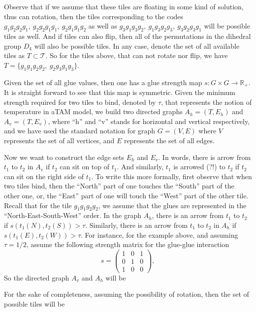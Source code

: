 \documentclass[11pt,a4paper]{article}
\theoremstyle{definition}
\theoremstyle{remark}
\theoremstyle{definition}
\begin{document}
	Observe that if we assume that these tiles are floating in some kind of solution, thus can rotation, then the tiles corresponding to the codes $ g_1g_2g_2g_1,\ g_2g_2g_1g_1,\ g_2g_1g_1g_2 $ as well as $ g_3g_1g_3g_2,\ g_1g_3g_2g_3,\ g_3g_2g_3g_1  $ will be possible tiles as well. And if tiles can also flip, then all of the permutations in the dihedral group $ D_4 $ will also be possible tiles. In any case, denote the set of all available tiles as $ T \subset\mathcal{T} $. So for the tiles above, that can not rotate nor flip, we have $ T=\{g_1g_1g_2g_2,\ g_2g_3g_1g_3\}. $
		
		
	Given the set of all glue values, then one has a glue strength map $ s: G\times G \to \mathbb{R}_{+} $. It is straight forward to see that this map is symmetric. Given the minimum strength required for two tiles to bind, denoted by $ \tau $, that represents the notion of temperature in aTAM model, we build two directed graphs $ A_h = (T, E_h) $ and $ A_v = (T,E_v) $, where ``h'' and ``v'' stands for horizontal and vertical respectively, and we have used the standard notation for graph $ G=(V,E) $ where $ V $ represents the set of all vertices, and $ E $ represents the set of all edges. 
	
	Now we want to construct the edge sets $ E_h $ and $ E_v $. In words, there is arrow from $ t_1 $ to $ t_2 $ in $ A_v $ if $ t_2 $ can sit on top of $ t_1 $. And similarly, $ t_1 $ is arrowed (?!) to $ t_2 $ if $ t_2 $ can sit on the right side of $ t_1 $. To write this more formally, first observe that when two tiles bind, then the ``North'' part of one touches the ``South'' part of the other one, or, the ``East'' part of one will touch  the ``West'' part of the other tile. Recall that for the tile $ g_1g_1g_2g_2 $, we assume that the glues are represented in the ``North-East-South-West'' order. In the graph $ A_h $, there is an arrow from $ t_1 $ to $ t_2 $ if $ s(t_1(N), t_2(S)) > \tau $. Similarly, there is an arrow from $ t_1 $ to $ t_2 $ in $ A_h $ if $ s(t_1(E),t_2(W)) > \tau $. For instance, for the example above, and assuming $ \tau=1/2 $, assume the following strength matrix for the glue-glue interaction
	\[ s = \begin{pmatrix}
		1 & 0 & 1 \\
		0 & 1 & 0 \\
		1 & 0 & 0
	\end{pmatrix}, \]
	So the directed graph $ A_v $ and $ A_h $ will be
	
	
	For the sake of completeness, assuming the possibility of rotation, then the set of possible tiles will be
	
	
\end{document}
